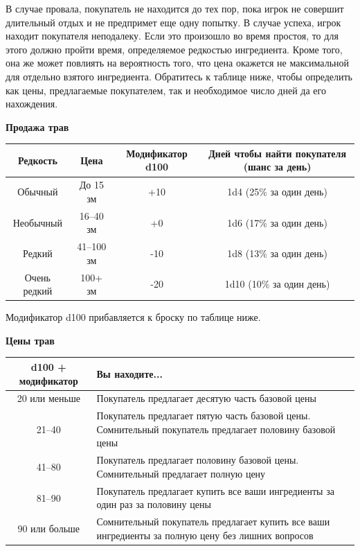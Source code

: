 \documentclass[a4paper, 9pt, twocolumn]{book}
\begin{document}
	В случае провала, покупатель не находится до тех пор, пока игрок не совершит длительный отдых и не предпримет еще одну попытку. В случае успеха, игрок  находит покупателя неподалеку. Если это произошло во время простоя, то для этого должно пройти время, определяемое  редкостью ингредиента. Кроме того, она же может повлиять на вероятность того, что цена окажется не максимальной для отдельно взятого ингредиента. Обратитесь к таблице ниже, чтобы определить как цены, предлагаемые покупателем, так и необходимое число дней да его нахождения.
	
	\textbf{Продажа трав}
	
	\begin{center}
		
		\begin{tabular}{|c|c|c|c|}
			\hline
			\textbf{Редкость} & \textbf{Цена} & \textbf{Модификатор d100} & \textbf{Дней чтобы найти покупателя (шанс за день)} \\
			\hline
			Обычный & До 15 зм & +10 & 1d4 (25\% за один день) \\
			\hline
			Необычный & 16--40 зм & +0 & 1d6 (17\% за один день) \\
			\hline
			Редкий & 41--100 зм & -10 & 1d8 (13\% за один день) \\
			\hline
			Очень редкий & 100+ зм & -20 & 1d10 (10\% за один день) \\
			\hline
		\end{tabular}
		
	\end{center}

	Модификатор d100 прибавляется к броску по таблице ниже.
	
	\medspace

	\textbf{Цены трав}
	
	\begin{center}
		
		\begin{tabular}{|c|l|}
			\hline
			\textbf{d100 + модификатор} & \textbf{Вы находите...} \\
			\hline
			20 или меньше & Покупатель предлагает десятую часть базовой цены \\
			\hline
			21--40 & Покупатель предлагает пятую часть базовой цены. Сомнительный покупатель предлагает половину базовой цены \\
			\hline
			41--80 & Покупатель предлагает половину базовой цены. Сомнительный предлагает полную цену \\
			\hline
			81--90 & Покупатель предлагает купить все ваши ингредиенты за один раз за половину цены \\
			\hline
			90 или больше & Сомнительный покупатель предлагает купить все ваши ингредиенты за полную цену без лишних вопросов \\
			\hline
		\end{tabular}
	\end{center}
\end{document}
